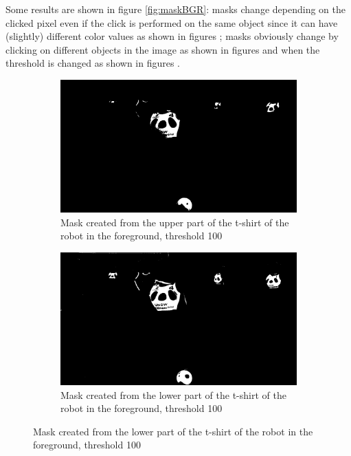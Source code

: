 \documentclass{article}
\begin{document}
Some results are shown in figure \ref{fig:maskBGR}: masks change depending on the clicked pixel even if the click is performed on the same object since it can have (slightly) different color values as shown in figures ; masks obviously change by clicking on different objects in the image as shown in figures  and when the threshold is changed as shown in figures .
\begin{figure}[H]
	\centering
	\begin{subfigure}{0.4\textwidth}
		\includegraphics[width=\textwidth]{robocup_maskBGR100upshirt.jpg}
		\caption{Mask created from the upper part of the t-shirt of the robot in the foreground, threshold 100}
		\label{fig:maskBGR100upshirt}
	\end{subfigure}
	\hfill
	\begin{subfigure}{0.4\textwidth}
		\includegraphics[width=\textwidth]{robocup_maskBGR100downshirt.jpg}
		\caption{Mask created from the lower part of the t-shirt of the robot in the foreground, threshold 100}
		\label{fig:maskBGR100downshirt}
	\end{subfigure}


\end{figure}
\end{document}
